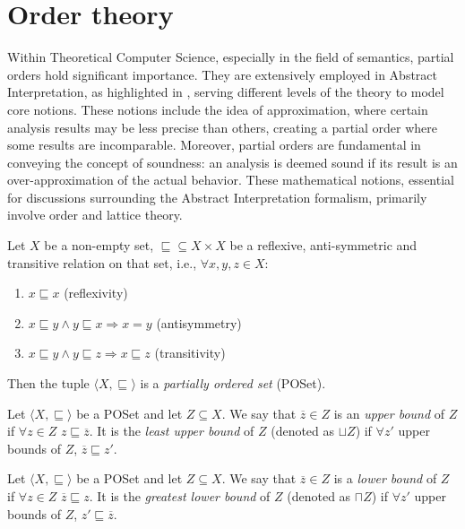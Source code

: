 \section{Order theory}\label{sec:ordertheory}

Within Theoretical Computer Science, especially in the field of
semantics, partial orders hold significant importance. They are
extensively employed in Abstract Interpretation, as highlighted in
\cite{mine:course}, serving different levels of the theory to model
core notions. These notions include the idea of approximation, where
certain analysis results may be less precise than others, creating a
partial order where some results are incomparable. Moreover, partial
orders are fundamental in conveying the concept of soundness: an
analysis is deemed sound if its result is an over-approximation of the
actual behavior. These mathematical notions, essential for discussions
surrounding the Abstract Interpretation formalism, primarily involve
order and lattice theory.

\begin{definition}
  Let \(X\) be a non-empty set, \(\sqsubseteq \subseteq X \times X\)
  be a reflexive, anti-symmetric and transitive relation on that set,
  i.e., \(\forall x,y,z \in X\):

  \begin{enumerate}
  \item \(x \sqsubseteq x\) (reflexivity)
  \item \(x \sqsubseteq y \wedge y \sqsubseteq x \Rightarrow x = y\)
    (antisymmetry)
  \item \(x \sqsubseteq y \wedge y \sqsubseteq z \Rightarrow x
    \sqsubseteq z\) (transitivity)
  \end{enumerate}

  Then the tuple \(\langle X, \sqsubseteq\rangle\) is a
  \emph{partially ordered set} (POSet).
\end{definition}

\begin{definition}
  Let \(\langle X, \sqsubseteq \rangle\) be a POSet and let
  \(Z \subseteq X\). We say that \(\overline{z} \in Z\) is an
  \emph{upper bound} of \(Z\) if \(\forall z \in Z\)
  \(z \sqsubseteq \overline{z}\). It is the \emph{least upper bound}
  of \(Z\) (denoted as \(\sqcup{Z}\)) if \(\forall z'\) upper bounds
  of \(Z\), \(\overline{z} \sqsubseteq z'\).
\end{definition}

\begin{definition}
  Let \(\langle X, \sqsubseteq \rangle\) be a POSet and let
  \(Z \subseteq X\). We say that \(\overline{z}\in Z\) is a
  \emph{lower bound} of \(Z\) if \(\forall z \in Z\)
  \(\overline{z} \sqsubseteq z\). It is the \emph{greatest lower
    bound} of \(Z\) (denoted as \(\sqcap{Z}\)) if \(\forall z'\) upper
  bounds of \(Z\), \(z' \sqsubseteq \overline{z}\).
\end{definition}

